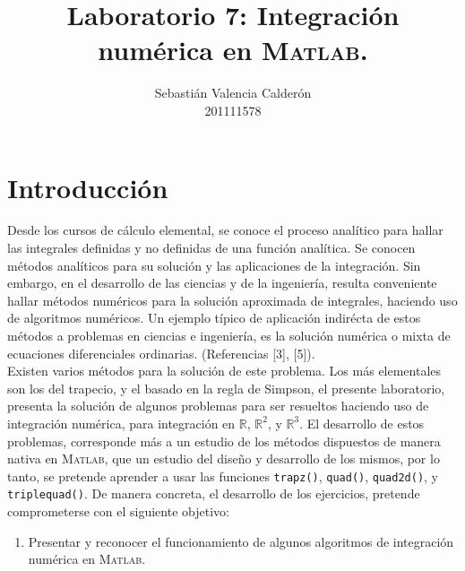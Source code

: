 \documentclass[11pt, spanish]{article}
\date{}
\begin{document}
\renewcommand\lstlistlistingname{Lista de Scripts}

\author{Sebastián Valencia Calderón \\ 201111578}
\title{Laboratorio 7: Integración numérica en \textsc{Matlab}.}
\maketitle

\section{Introducción}

Desde los cursos de cálculo elemental, se conoce el proceso analítico para hallar las integrales definidas y no definidas de una función analítica. Se conocen métodos analíticos para su solución y las aplicaciones de la integración. Sin embargo, en el desarrollo de las ciencias y de la ingeniería, resulta conveniente hallar métodos numéricos para la solución aproximada de integrales, haciendo uso de algoritmos numéricos. Un ejemplo típico de aplicación indirécta de estos métodos a problemas en ciencias e ingeniería, es la solución numérica o mixta de ecuaciones diferenciales ordinarias. (Referencias [3], [5]).\\

Existen varios métodos para la solución de este problema. Los más elementales son los del trapecio, y el basado en la regla de Simpson, el presente laboratorio, presenta la solución de algunos problemas para ser resueltos haciendo uso de integración numérica, para integración en $\mathbb{R}$, $\mathbb{R}^2$, y $\mathbb{R}^3$. El desarrollo de estos problemas, corresponde más a un estudio de los métodos dispuestos de manera nativa en \textsc{Matlab}, que un estudio del diseño y desarrollo de los mismos, por lo tanto, se pretende aprender a usar las funciones \texttt{trapz()}, \texttt{quad()}, \texttt{quad2d()}, y \texttt{triplequad()}. De manera concreta, el desarrollo de los ejercicios, pretende comprometerse con el siguiente objetivo:

\begin{enumerate}
\item Presentar y reconocer el funcionamiento de algunos algoritmos de integración numérica en \textsc{Matlab}.
\end{enumerate}

\end{document}
